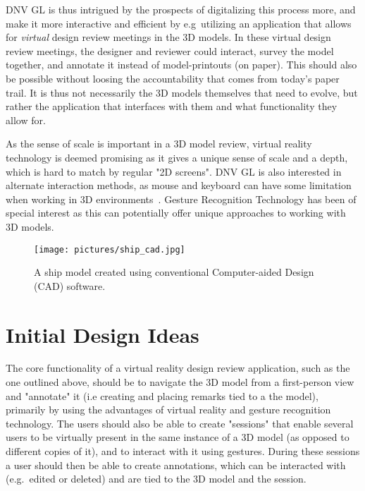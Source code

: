 DNV GL is thus intrigued by the prospects of digitalizing this process more, and make it more interactive and efficient by 
e.g~utilizing an application that allows for \textit{virtual} design review meetings in the 3D models. In these virtual design review meetings, 
the designer and reviewer could interact, survey the model together, and annotate it instead of model-printouts (on paper). This should also be possible 
without loosing the accountability that comes from today’s paper trail. It is thus not necessarily the 3D models themselves that 
need to evolve, but rather the application that interfaces with them and what functionality they allow for.  

As the sense of scale is important in a 3D model review, virtual reality technology is deemed promising as it gives a unique sense of scale
and a depth, which is hard to match by regular "2D screens". 
DNV GL is also interested in alternate interaction methods, as mouse and keyboard can have some limitation when working in 3D environments~\citep{Rautaray2015}. 
Gesture Recognition Technology has been of special interest as this can potentially offer unique approaches to working with 3D models.

\begin{figure}%
	\texttt{[image: pictures/ship\_cad.jpg]}
	\caption[A ship model created using conventional CAD software.]{A ship model created using conventional Computer-aided Design (CAD) software.~\cite{IMO}}
	\label{fig:ship_cad}
\end{figure} 


\section{Initial Design Ideas}
\label{sec:initial_design}
The core functionality of a virtual reality design review application, such as the one outlined above, should be to navigate the 3D model from a first-person view 
and "annotate" it (i.e creating and placing remarks tied to a the model), primarily by using the advantages of virtual reality and gesture recognition technology.
The users should also be able to create "sessions" that enable several users to be virtually present in the same instance of a 3D model (as opposed to different copies of it),
and to interact with it using gestures. During these sessions a user should then be able to create annotations, 
which can be interacted with (e.g.~edited or deleted) and are tied to the 3D model and the session. 


